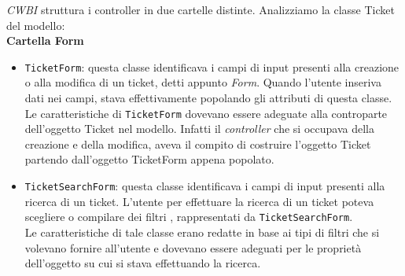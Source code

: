 \noindent
\textit{CWBI} struttura i controller in due cartelle distinte. Analizziamo la classe Ticket del modello:\\

\textbf{Cartella Form}
\begin{itemize}
\item \texttt{TicketForm}: questa classe identificava i campi di input presenti alla creazione o alla modifica di un ticket, detti appunto \textit{Form}. Quando l'utente inseriva dati nei campi, stava effettivamente popolando gli attributi di questa classe. \\ 
Le caratteristiche di \texttt{TicketForm} dovevano essere adeguate alla controparte dell'oggetto Ticket nel modello. Infatti il \textit{controller} che si occupava della creazione e della modifica, aveva il compito di costruire l'oggetto Ticket partendo dall'oggetto TicketForm appena popolato. 

\item \texttt{TicketSearchForm}: questa classe identificava i campi di input presenti alla ricerca di un ticket. L'utente per effettuare la ricerca di un ticket poteva scegliere o compilare dei filtri , rappresentati da \texttt{TicketSearchForm}. \\
Le caratteristiche di tale classe erano redatte in base ai tipi di filtri che si volevano fornire all'utente e dovevano essere adeguati per le proprietà dell'oggetto su cui si stava effettuando la ricerca.

\end{itemize}
\medskip

